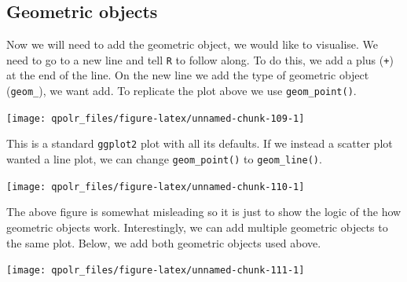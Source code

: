 \documentclass[12pt,oneside]{reedthesis}
\theoremstyle{definition}
\theoremstyle{definition}
\theoremstyle{definition}
\theoremstyle{remark}
\begin{document}
  \subsection{Geometric objects}\label{geometric-objects}
  
  Now we will need to add the geometric object, we would like to
  visualise. We need to go to a new line and tell \texttt{R} to follow
  along. To do this, we add a plus (\texttt{+}) at the end of the line. On
  the new line we add the type of geometric object (\texttt{geom\_}), we
  want add. To replicate the plot above we use \texttt{geom\_point()}.
  \begin{Shaded}
  \begin{Highlighting}[]
  \NormalTok{(}\OperatorTok{+}
  \StringTok{  }\NormalTok{()}
  \end{Highlighting}
  \end{Shaded}
  \begin{center}\texttt{[image: qpolr\_files/figure-latex/unnamed-chunk-109-1]} \end{center}
  
  This is a standard \texttt{ggplot2} plot with all its defaults. If we
  instead a scatter plot wanted a line plot, we can change
  \texttt{geom\_point()} to \texttt{geom\_line()}.
  \begin{Shaded}
  \begin{Highlighting}[]
  \NormalTok{(}\OperatorTok{+}
  \StringTok{  }\NormalTok{()}
  \end{Highlighting}
  \end{Shaded}
  \begin{center}\texttt{[image: qpolr\_files/figure-latex/unnamed-chunk-110-1]} \end{center}
  
  The above figure is somewhat misleading so it is just to show the logic
  of the how geometric objects work. Interestingly, we can add multiple
  geometric objects to the same plot. Below, we add both geometric objects
  used above.
  \begin{Shaded}
  \begin{Highlighting}[]
  \NormalTok{(}\OperatorTok{+}
  \StringTok{  }\NormalTok{() }\OperatorTok{+}
  \StringTok{  }\NormalTok{()}
  \end{Highlighting}
  \end{Shaded}
  \begin{center}\texttt{[image: qpolr\_files/figure-latex/unnamed-chunk-111-1]} \end{center}
  
\end{document}
